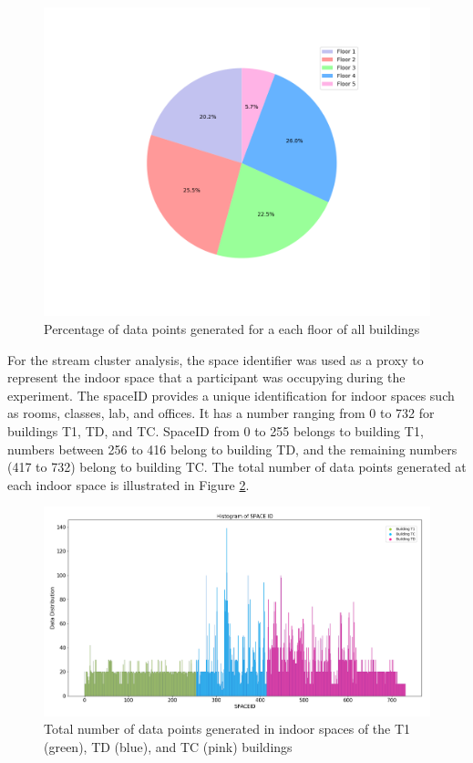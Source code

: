 \begin{figure}[!ht]
    \centering
    \includegraphics[width = 12 cm]{image/Chapters/Chapter6/floors.png}
    \caption{Percentage of data points generated for a each floor of all buildings}
    \label{Pfloor}
\end{figure} 

For the stream cluster analysis, the space identifier was used as a proxy to represent the indoor space that a participant was occupying during the experiment. The spaceID provides a unique identification for indoor spaces such as rooms, classes, lab, and offices. It has a number ranging from 0 to 732 for  buildings T1, TD, and TC. SpaceID from 0 to 255 belongs to building T1, numbers between 256 to 416 belong to building TD, and the remaining numbers (417 to 732) belong to building TC. The total number of data points generated at each indoor space is illustrated in Figure \ref{spaceiduniq }. 

\begin{figure}[h]
    \centering
    \includegraphics[width = 16 cm]{image/Chapters/Chapter6/uniqspaceid.png}
    \caption{ Total number of data points generated in indoor spaces of the T1 (green), TD (blue), and TC (pink) buildings}
    \label{spaceiduniq }
\end{figure}

